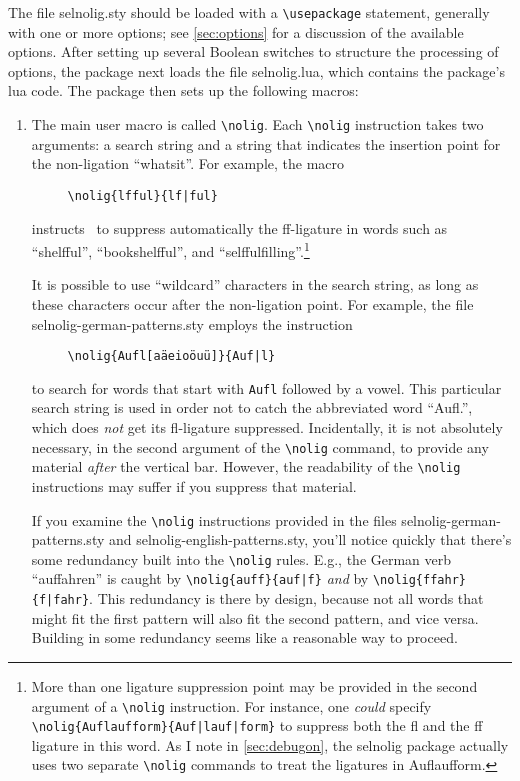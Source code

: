 \documentclass[12pt]{article}
\newcommand{\pkg}[1]{\textsf{#1}}
\newcommand{\opt}[1]{\texttt{#1}}
\newcommand{\cmmd}[1]{\texttt{\textbackslash #1}}
\begin{document}
The file \pkg{selnolig.sty} should be loaded with a \cmmd{usepackage} statement, generally with one or more options; see \cref{sec:options} for a discussion of the available options. After setting up several Boolean switches to structure the processing of options, the package next loads the file \pkg{selnolig.lua}, which contains the package's lua code.
The package then sets up the following macros:
\begin{enumerate}
\item The main user macro is called \cmmd{nolig}. Each \cmmd{nolig} instruction takes two arguments: a search string and a string that indicates the insertion point for the non-ligation \enquote{whatsit}. For example, the macro
\begin{Verbatim}
     \nolig{lfful}{lf|ful}
\end{Verbatim}
instructs \LuaLaTeX\ to suppress automatically the ff-ligature in words such as \enquote{shelfful}, \enquote{bookshelfful}, and \enquote{selffulfilling}.\footnote{More than one ligature suppression point may be provided in the second argument of a \cmmd{nolig} instruction. For instance, one \emph{could} specify \Verb+\nolig{Auflaufform}{Auf|lauf|form}+ to suppress both the fl and the ff ligature in this word. As I note in \cref{sec:debugon}, the \pkg{selnolig} package actually uses two separate \cmmd{nolig} commands to treat the ligatures in Auflaufform. }


It is possible to use \enquote{wildcard} characters in the search string, as long as these characters occur after the non-ligation point. For example, the file \pkg{selnolig-german-patterns.sty} employs the instruction 
\begin{Verbatim}
     \nolig{Aufl[aäeioöuü]}{Auf|l}
\end{Verbatim}
to search for words that start with \opt{Aufl} followed by a vowel. This particular search string is used in order not to catch the abbreviated word \enquote{Aufl.}, which does \emph{not} get its fl-ligature suppressed. Incidentally, it is not absolutely necessary, in the second argument of the \cmmd{nolig} command, to provide any material \emph{after} the vertical bar. However, the readability of the \cmmd{nolig} instructions may suffer if you suppress that material.

If you examine the \cmmd{nolig} instructions provided in the files \pkg{selnolig-german-patterns.sty} and \pkg{selnolig-english-patterns.sty}, you'll notice quickly that there's some redundancy built into the \cmmd{nolig} rules. E.g., the German verb \enquote{auffahren} is caught by \Verb+\nolig{auff}{auf|f}+ \emph{and} by \Verb+\nolig{ffahr}{f|fahr}+. This redundancy is there by design, because not all words that might fit the first pattern will also fit the second pattern, and vice versa. Building in some redundancy seems like a reasonable way to proceed.


\end{enumerate}
\end{document}
